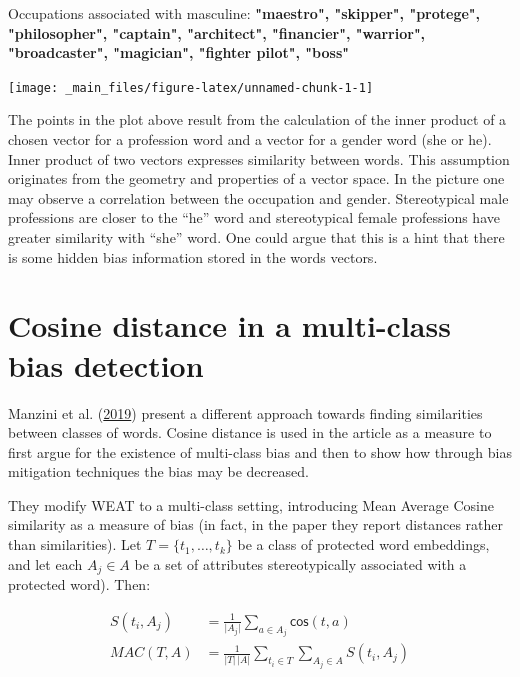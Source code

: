 \documentclass[12pt,]{book}
\begin{document}
Occupations associated with masculine:
\textbf{"maestro", "skipper", "protege", "philosopher", "captain", "architect", "financier", "warrior", "broadcaster", "magician", "fighter pilot", "boss"}

\vspace{1mm} \footnotesize

\begin{center}\texttt{[image: \_main\_files/figure-latex/unnamed-chunk-1-1]} \end{center}

\normalsize

The points in the plot above result from the calculation of the inner
product of a chosen vector for a profession word and a vector for a
gender word (she or he). Inner product of two vectors expresses
similarity between words. This assumption originates from the geometry
and properties of a vector space. In the picture one may observe a
correlation between the occupation and gender. Stereotypical male
professions are closer to the ``he'' word and stereotypical female
professions have greater similarity with ``she'' word. One could argue
that this is a hint that there is some hidden bias information stored in
the words vectors.

\section{Cosine distance in a multi-class bias
detection}\label{cosine-distance-in-a-multi-class-bias-detection}

Manzini et al.
(\protect\hyperlink{ref-Manzini2019blackToCriminal}{2019}) present a
different approach towards finding similarities between classes of
words. Cosine distance is used in the article as a measure to first
argue for the existence of multi-class bias and then to show how through
bias mitigation techniques the bias may be decreased.

They modify WEAT to a multi-class setting, introducing Mean Average
Cosine similarity as a measure of bias (in fact, in the paper they
report distances rather than similarities). Let
\(T = \{t_1, \dots, t_k\}\) be a class of protected word embeddings, and
let each \(A_j\in A\) be a set of attributes stereotypically associated
with a protected word). Then:

\begin{align}
S(t_i, A_j) & = \frac{1}{\vert A_j\vert}\sum_{a\in A_j}\mathsf{cos}(t,a) \\
MAC(T,A) & = \frac{1}{\vert T \vert \,\vert A\vert}\sum_{t_i \in T }\sum_{A_j \in A} S(t_i,A_j)
\end{align}
\end{document}
